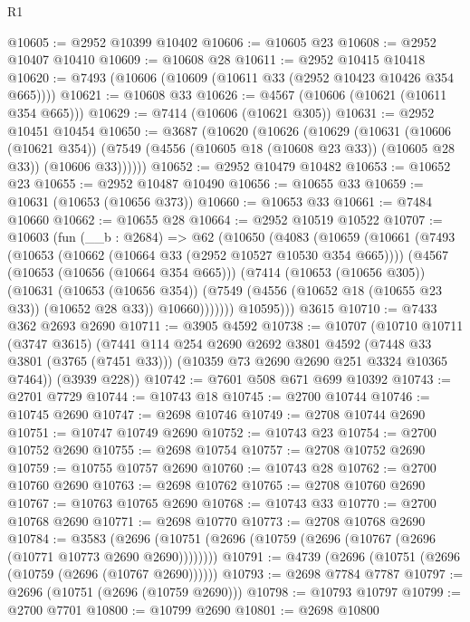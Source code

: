 \begin{lexlean}{R1}
\begin{coremodule}
@10605 := @2952 @10399 @10402
@10606 := @10605 @23
@10608 := @2952 @10407 @10410
@10609 := @10608 @28
@10611 := @2952 @10415 @10418
@10620 := @7493 (@10606 (@10609 (@10611 @33 (@2952 @10423 @10426 @354 @665))))
@10621 := @10608 @33
@10626 := @4567 (@10606 (@10621 (@10611 @354 @665)))
@10629 := @7414 (@10606 (@10621 @305))
@10631 := @2952 @10451 @10454
@10650 := @3687
    (@10620
      (@10626
        (@10629
          (@10631
            (@10606 (@10621 @354))
            (@7549 (@4556 (@10605 @18 (@10608 @23 @33)) (@10605 @28 @33)) (@10606 @33))))))
@10652 := @2952 @10479 @10482
@10653 := @10652 @23
@10655 := @2952 @10487 @10490
@10656 := @10655 @33
@10659 := @10631 (@10653 (@10656 @373))
@10660 := @10653 @33
@10661 := @7484 @10660
@10662 := @10655 @28
@10664 := @2952 @10519 @10522
@10707 := @10603
    (fun (__b : @2684) =>
    @62
      (@10650
        (@4083
          (@10659
            (@10661
              (@7493
                (@10653 (@10662 (@10664 @33 (@2952 @10527 @10530 @354 @665))))
                (@4567
                  (@10653 (@10656 (@10664 @354 @665)))
                  (@7414
                    (@10653 (@10656 @305))
                    (@10631
                      (@10653 (@10656 @354))
                      (@7549 (@4556 (@10652 @18 (@10655 @23 @33)) (@10652 @28 @33)) @10660)))))))
          @10595)))
    @3615
@10710 := @7433 @362 @2693 @2690
@10711 := @3905 @4592
@10738 := @10707
    (@10710
      @10711
      (@3747 @3615)
      (@7441
        @114
        @254
        @2690
        @2692
        @3801
        @4592
        (@7448 @33 @3801 (@3765 (@7451 @33)))
        (@10359 @73 @2690 @2690 @251 @3324 @10365 @7464))
      (@3939 @228))
@10742 := @7601 @508 @671 @699 @10392
@10743 := @2701 @7729
@10744 := @10743 @18
@10745 := @2700 @10744
@10746 := @10745 @2690
@10747 := @2698 @10746
@10749 := @2708 @10744 @2690
@10751 := @10747 @10749 @2690
@10752 := @10743 @23
@10754 := @2700 @10752 @2690
@10755 := @2698 @10754
@10757 := @2708 @10752 @2690
@10759 := @10755 @10757 @2690
@10760 := @10743 @28
@10762 := @2700 @10760 @2690
@10763 := @2698 @10762
@10765 := @2708 @10760 @2690
@10767 := @10763 @10765 @2690
@10768 := @10743 @33
@10770 := @2700 @10768 @2690
@10771 := @2698 @10770
@10773 := @2708 @10768 @2690
@10784 := @3583
    (@2696 (@10751 (@2696 (@10759 (@2696 (@10767 (@2696 (@10771 @10773 @2690 @2690))))))))
@10791 := @4739 (@2696 (@10751 (@2696 (@10759 (@2696 (@10767 @2690))))))
@10793 := @2698 @7784 @7787
@10797 := @2696 (@10751 (@2696 (@10759 @2690)))
@10798 := @10793 @10797
@10799 := @2700 @7701
@10800 := @10799 @2690
@10801 := @2698 @10800

\end{coremodule}
\end{lexlean}
